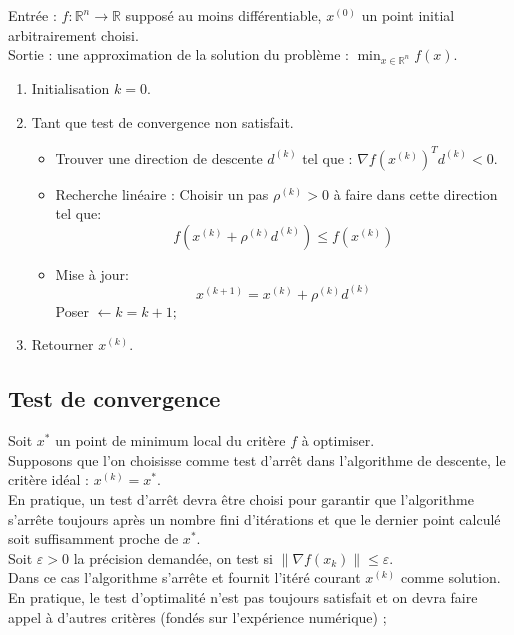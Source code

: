 \documentclass[12pt,a4paper,openay]{book}
\numberwithin{equation}{chapter}
\newcommand{\R}{\mathbb{R}}
\begin{document}
	Entr\'ee : $f: \R^{n} \to \R$ suppos\'e au moins diff\'erentiable, $x^{(0)}$ un point initial
	arbitrairement choisi.\\
	Sortie : une approximation de la solution du probl\`eme : $\min_{x \in \R^{n}} f(x)$.
	
				
				
	\begin{enumerate}
		\item Initialisation $k=0$.
		\item Tant que test de convergence non satisfait.
		\begin{itemize}
			\item[a)] Trouver une direction de descente $d^{(k)}$ tel que : $\nabla f\left(x^{(k)}\right)^{T} d^{(k)}<0$.
			\item[b)] Recherche lin\'eaire : Choisir un pas $\rho^{(k)}>0$ \`a faire dans cette direction
			tel que:
			$$
			f\left(x^{(k)}+\rho^{(k)} d^{(k)}\right) \leq f\left(x^{(k)}\right)
			$$				
			\item[c)] Mise \`a jour:				
			$$
			x^{(k+1)}=x^{(k)}+\rho^{(k)} d^{(k)}
			$$				
			Poser $\leftarrow k=k+1 ;$
		\end{itemize}
		\item Retourner $x^{(k)}$.
	\end{enumerate}
	
	\subsection*{Test de convergence}
	Soit $x^{*}$ un point de minimum local du crit\`ere  $f$ \`a optimiser.\\	
	Supposons que l'on choisisse comme test d'arr\^et dans l'algorithme de descente, le crit\`ere id\'eal : $ x^{(k)}=x^{*} $.\\	
	En pratique, un test d'arr\^et devra \^etre choisi pour garantir que l'algorithme s'arr\^ete toujours apr\`es un nombre fini d'it\'erations et que le dernier point calcul\'e soit suffisamment proche de $x^{*}$.\\	
	Soit $\varepsilon>0$ la pr\'ecision demand\'ee, on test si $\left\|\nabla f\left(x_{k}\right)\right\| \leq \varepsilon$.\\	
	Dans ce cas l'algorithme s'arr\^ete et fournit l'it\'er\'e courant $x^{(k)}$ comme solution.\\	
	En pratique, le test d'optimalit\'e n'est pas toujours satisfait et on devra faire appel \`a d'autres crit\`eres (fond\'es sur l'exp\'erience num\'erique) ;
	
\end{document}
